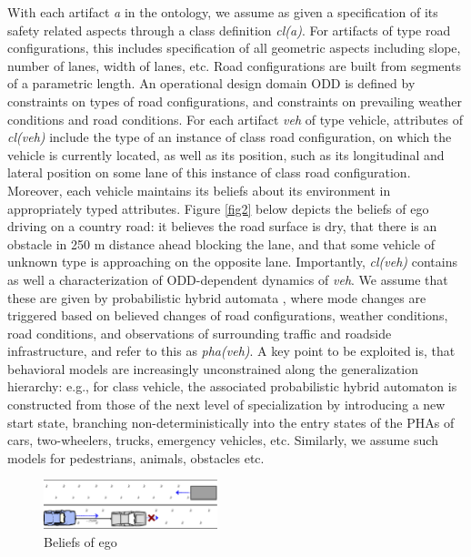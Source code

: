 With each artifact  \emph{a}  in the ontology, we assume as given a specification of its safety related aspects through a class definition \emph{cl(a)}. For artifacts of type road configurations, this includes specification of all geometric aspects including slope, number of lanes, width of lanes, etc. Road configurations are built from segments of a parametric length. An operational design domain ODD is defined by constraints on types of road configurations, and constraints on prevailing weather conditions and road conditions. For each artifact \emph{veh} of type vehicle, attributes of \emph{cl(veh)} include the type of an instance of class road configuration, on which the vehicle is currently located, as well as its position, such as its longitudinal and lateral position on some lane of this instance of class road configuration. Moreover, each vehicle maintains its beliefs about its environment in appropriately typed attributes. Figure \ref{fig2} below depicts the beliefs of ego driving on a country road: it believes the road surface is dry, that there is an obstacle in 250 m distance ahead blocking the lane, and that some vehicle of unknown type is approaching on the opposite lane. Importantly, \emph{cl(veh)} contains as well a characterization of ODD-dependent dynamics of \emph{veh}. We assume that these are given by probabilistic hybrid automata \textcolor{red}{\cite{pha}}, where mode changes are triggered based on believed changes of road configurations, weather conditions, road conditions, and observations of surrounding traffic and roadside infrastructure, and refer to this as \emph{pha(veh)}. A key point to be exploited is, that behavioral models are increasingly unconstrained along the generalization hierarchy: e.g., for class vehicle, the associated probabilistic hybrid automaton is constructed from those of the next level of specialization by introducing a new start state, branching non-deterministically into the entry states of the PHAs of cars, two-wheelers, trucks, emergency vehicles, etc. Similarly, we assume such models for pedestrians, animals, obstacles etc.

\begin{figure}
    \centering
    \includegraphics[width=0.45\textwidth]{obstacle+vehicle2.eps}
    \caption{Beliefs of ego}
    \label{fig2}\label{fig:obstacle}
\end{figure}

